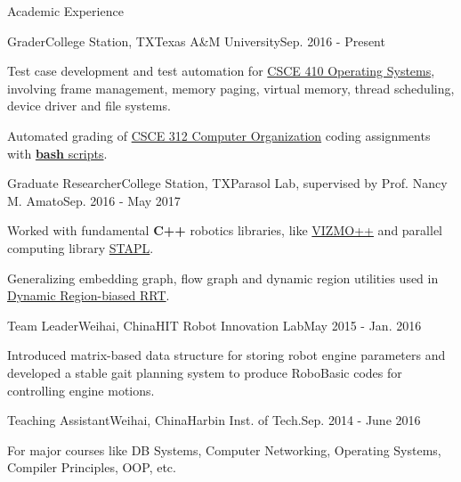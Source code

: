 \documentclass{resume} %
\begin{document}
\begin{rSection}{Academic Experience}
\begin{rSubsection}{Grader}{College Station, TX}{Texas A\&M University}{Sep. 2016 - Present}
\item Test case development and test automation for \href{http://faculty.cse.tamu.edu/dilma/web-csce410-fall16/index.htm}{CSCE 410 Operating Systems}, involving frame management, memory paging, virtual memory, thread scheduling, device driver and file systems.
\item Automated grading of \href{http://faculty.cse.tamu.edu/djimenez/312/}{CSCE 312 Computer Organization} coding assignments with \href{https://github.com/tamu-csce312/hw-test}{\textbf{bash} scripts}.
\end{rSubsection}

\begin{rSubsection}{Graduate Researcher}{College Station, TX}{Parasol Lab, supervised by Prof. Nancy M. Amato}{Sep. 2016 - May 2017}
\item Worked with fundamental \textbf{C++} robotics libraries, like \href{https://parasol.tamu.edu/groups/amatogroup/research/UserGuided/Old/vizmo++/}{VIZMO++} and parallel computing library \href{https://parasol.tamu.edu/groups/rwergergroup/research/stapl/}{STAPL}.
\item Generalizing embedding graph, flow graph and dynamic region utilities used in \href{http://wafr2016.berkeley.edu/papers/WAFR_2016_paper_36.pdf}{Dynamic Region-biased RRT}.
\end{rSubsection}

\begin{rSubsection}{Team Leader}{Weihai, China}{HIT Robot Innovation Lab}{May 2015 - Jan. 2016}
\item Introduced matrix-based data structure for storing robot engine parameters and developed a stable gait planning system to produce RoboBasic codes for controlling engine motions.
\end{rSubsection}

\begin{rSubsection}{Teaching Assistant}{Weihai, China}{Harbin Inst. of Tech.}{Sep. 2014 - June 2016}
\item For major courses like DB Systems, Computer Networking, Operating Systems, Compiler Principles, OOP, etc.
\end{rSubsection}
\end{rSection}
\end{document}
